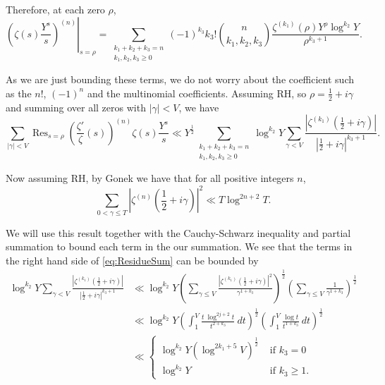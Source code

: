 \documentclass[12pt,a4paper,reqno]{amsart}
\DeclareMathOperator*{\Res}{Res}
\theoremstyle{remark}
\numberwithin{equation}{section}
\begin{document}
Therefore, at each zero $\rho$,
\begin{equation*}
    \left. \left( \zeta(s) \frac{Y^s}{s} \right)^{(n)} \right\vert_{s=\rho}= \sum_{\substack{k_1+k_2+k_3 = n \\ k_1, k_2, k_3 \geq 0}} (-1)^{k_3} k_3!  \binom{n}{k_1, k_2, k_3} \frac{\zeta^{(k_1)} (\rho) Y^{\rho} \log^{k_2} Y} {\rho^{k_3+1}}.
\end{equation*}

As we are just bounding these terms, we do not worry about the coefficient such as the $n!$, $(-1)^n$ and the multinomial coefficients. Assuming RH, so $\rho = \frac12 + i\gamma$ and summing over all zeros with $|\gamma| < V$, we have 
\begin{equation}\label{eq:ResidueSum}
   \sum_{|\gamma|<V}  \Res_{s=\rho} \left( \frac{\zeta'}{\zeta}(s) \right)^{(n)} \zeta(s) \frac{Y^s}{s} \ll Y^{\frac{1}{2}} \sum_{\substack{k_1+k_2+k_3 = n \\ k_1, k_2, k_3 \geq 0}} \log^{k_2} Y  \sum_{\gamma < V}  \frac{\left| \zeta^{(k_1)} (\frac12 +i\gamma) \right|} {\left| \frac12+i\gamma \right| ^{k_3+1}}.
\end{equation}


Now assuming RH, by Gonek \cite{Gonek} we have that for all positive integers $n$,
\[
\sum_{0< \gamma \leq T} \left|\zeta^{(n)} \left(\frac{1}{2} + i\gamma \right) \right|^2 \ll T \log^{2n+2} T.
\]

We will use this result together with the Cauchy-Schwarz inequality and partial summation to bound each term in the our summation. We see that the terms in the right hand side of \eqref{eq:ResidueSum} can be bounded by
\begin{align*}
    \log^{k_2} Y  \sum_{\gamma < V}  \frac{\left| \zeta^{(k_1)} (\frac12 +i\gamma) \right|} {\left| \frac12+i\gamma \right| ^{k_3+1}} &\ll \log ^{k_2} Y \left( \sum_{\gamma \leq V} \frac{|\zeta^{(k_1)} (\frac{1}{2} + i\gamma)|^2}{\gamma^{1+k_3}}
\right)^{\frac{1}{2}} \left(\sum_{\gamma \leq V} \frac{1}{\gamma^{1+k_3}}\right)^{\frac{1}{2}} \\
&\ll  \log ^{k_2} Y \left( \int_{1}^{V} \frac{t \ \log^{2j+2} t}{t^{2+k_3}} \ dt \right)^{\frac{1}{2}} \left( \int_{1}^{V} \frac{\log t}{t^{1+k_3}} \ dt \right)^{\frac{1}{2}} \\
&\ll 
\begin{cases}
\log ^{k_2} Y \left( \log^{2k_1 + 5} V \right)^{\frac{1}{2}} &\text{ if $k_3 = 0$} \\
\log ^{k_2} Y &\text{ if $k_3 \geq 1$.}
\end{cases}
\end{align*}
\end{document}
